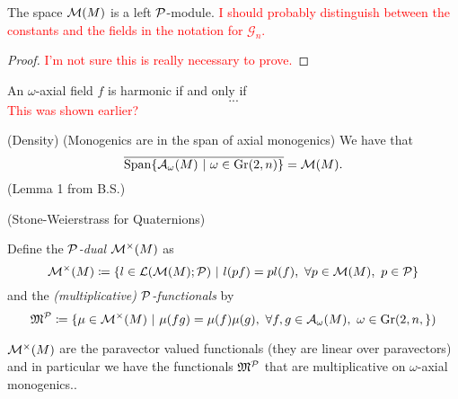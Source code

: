 \documentclass[12pt]{article}
\begin{document}
\begin{proposition}
The space $\mathcal{M}(M)$ is a left $\mathcal{P}$-module. \textcolor{red}{I should probably distinguish between the constants and the fields in the notation for $\mathcal{G}_n$.}
\end{proposition}
\begin{proof}
    \textcolor{red}{I'm not sure this is really necessary to prove.}
\end{proof}

\begin{proposition}
An $\omega$-axial field $f$ is harmonic if and only if
\[
...
\]
\textcolor{red}{This was shown earlier?}
\end{proposition}

\begin{lemma}
(Density)  (Monogenics are in the span of axial monogenics) We have that
\[
\overline{\operatorname{Span} \{ \mathcal{A}_{\omega}(M) ~\vert~ \omega \in \operatorname{Gr}(2,n) \}} = \mathcal{M}(M).
\]
(Lemma 1 from B.S.)
\end{lemma}

\begin{theorem}
(Stone-Weierstrass for Quaternions)
\end{theorem}

\begin{definition}
    Define the \emph{$\mathcal{P}$-dual} $\mathcal{M}^\times(M)$ as
    \[
        \mathcal{M}^\times(M) \coloneqq \{ l \in \mathcal{L}(\mathcal{M}(M); \mathcal{P}) ~\vert~ l(pf) = pl(f), ~\forall p \in \mathcal{M}(M), ~p \in \mathcal{P} \}
    \]
    and the \emph{(multiplicative) $\mathcal{P}$-functionals} by
    \[
        \mathfrak{M}^{\mathcal{P}} \coloneqq \{ \mu \in \mathcal{M}^\times(M) ~\vert~ \mu(fg) = \mu(f)\mu(g), ~\forall f,g\in \mathcal{A}_{\omega}(M), ~\omega \in \operatorname{Gr}(2,n,\})
    \]
\end{definition}

$\mathcal{M}^\times(M)$ are the paravector valued functionals (they are linear over paravectors) and in particular we have the functionals $\mathfrak{M}^{\mathcal{P}}$ that are multiplicative on $\omega$-axial monogenics..
\end{document}
